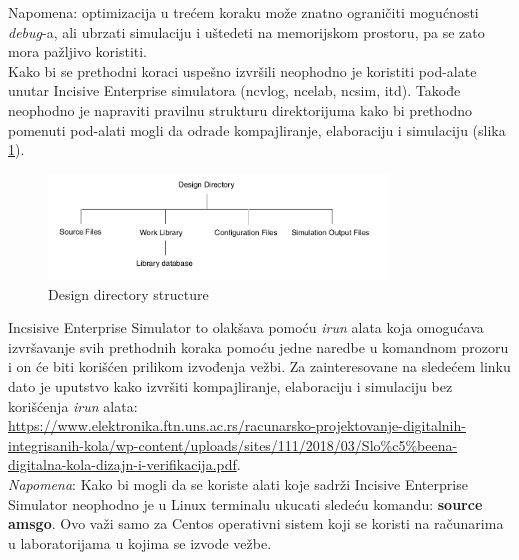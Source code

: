 Napomena: optimizacija u trećem koraku može znatno ograničiti mogućnosti
\emph{debug}-a, ali ubrzati simulaciju i uštedeti na memorijskom prostoru, pa se
zato mora pažljivo koristiti.\\


Kako bi se prethodni koraci uspešno izvršili neophodno je koristiti pod-alate unutar
Incisive Enterprise simulatora (ncvlog, ncelab, ncsim, itd). Takođe neophodno je napraviti
pravilnu strukturu direktorijuma kako bi prethodno pomenuti pod-alati mogli da odrade kompajliranje,
elaboraciju i simulaciju (slika \ref{fig:design_directory_structure}).



\begin{figure}[h!]
  \center
  \includegraphics[width=90mm, scale=0.5]{img/v1_design_hierarchy.png}
  \caption{Design directory structure}
  \label{fig:design_directory_structure}
\end{figure}

Incsisive Enterprise Simulator to olakšava pomoću \emph{irun} alata
koja omogućava izvršavanje svih prethodnih koraka pomoću jedne naredbe u komandnom prozoru i
on će biti korišćen prilikom izvođenja vežbi.
Za zainteresovane na sledećem linku dato je uputstvo kako izvršiti kompajliranje, elaboraciju i simulaciju bez
korišćenja \emph{irun} alata:\\
\url{https://www.elektronika.ftn.uns.ac.rs/racunarsko-projektovanje-digitalnih-integrisanih-kola/wp-content/uploads/sites/111/2018/03/Slo\%c5\%beena-digitalna-kola-dizajn-i-verifikacija.pdf}.\\


\emph{Napomena}: Kako bi mogli da se koriste alati koje sadrži Incisive Enterprise Simulator neophodno
je u Linux terminalu ukucati sledeću komandu: \textbf{source amsgo}. Ovo važi samo za Centos
operativni sistem koji se koristi na računarima u laboratorijama u kojima se izvode vežbe.



